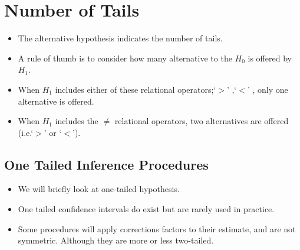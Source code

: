 \documentclass[a4paper,12pt]{article}
\begin{document}
	\section*{Number of Tails  }
	
	\begin{itemize}
		\item The alternative hypothesis indicates the number of tails.
		\item A rule of thumb is to consider how many alternative to the $H_0$ is offered by $H_1$.
		\item When $H_1$ includes either of these relational operators;`$>$' ,`$<$' , only one alternative is offered.
		\item When $H_1$ includes the $\neq$ relational operators, two alternatives are offered (i.e.`$>$' or `$<$').
	\end{itemize}

\subsection*{One Tailed Inference Procedures}
\begin{itemize}
	\item We will briefly look at one-tailed hypothesis.
	\item One tailed confidence intervals do exist but are rarely used in practice.
	\item Some procedures will apply corrections factors to their estimate, and are not symmetric. Although they are more or less two-tailed.
\end{itemize}
\end{document}
